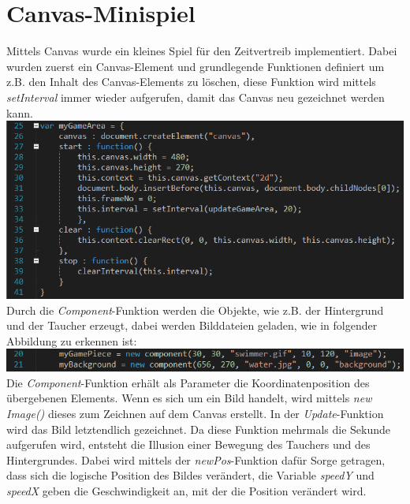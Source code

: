 \section{Canvas-Minispiel}
Mittels Canvas wurde ein kleines Spiel f\"ur den Zeitvertreib implementiert. Dabei wurden zuerst ein Canvas-Element und grundlegende Funktionen definiert um z.B. den Inhalt des Canvas-Elements zu löschen, diese Funktion wird mittels \textit{setInterval} immer wieder aufgerufen, damit das Canvas neu gezeichnet werden kann.     
\newline
\includegraphics[width=1\textwidth]{img/vincent/abb04.png}
\newline
Durch die \textit{Component}-Funktion werden die Objekte, wie z.B. der Hintergrund und der Taucher erzeugt, dabei werden Bilddateien geladen, wie in folgender Abbildung zu erkennen ist: 
\newline
\includegraphics[width=1\textwidth]{img/vincent/abb05.png}
\newline
Die \textit{Component}-Funktion erh\"alt als Parameter die Koordinatenposition des \"ubergebenen Elements. Wenn es sich um ein Bild handelt, wird mittels \textit{new Image()} dieses zum Zeichnen auf dem Canvas erstellt. In der \textit{Update}-Funktion wird das Bild letztendlich gezeichnet. Da diese Funktion mehrmals die Sekunde aufgerufen wird, entsteht die Illusion einer Bewegung des Tauchers und des Hintergrundes. Dabei wird mittels der \textit{newPos}-Funktion daf\"ur Sorge getragen, dass sich die logische Position des Bildes ver\"andert, die Variable \textit{speedY} und \textit{speedX} geben die Geschwindigkeit an, mit der die Position ver\"andert wird. 
\newline
